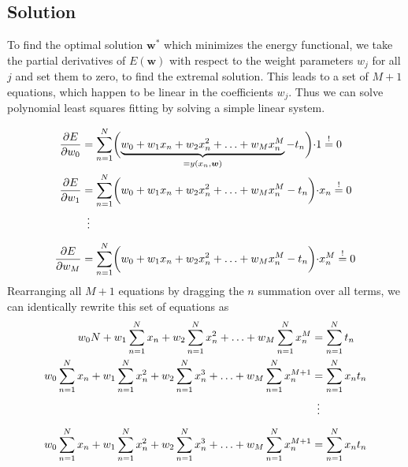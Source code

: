 \documentclass[11pt,DINA4, fleqn]{amsart}
\def\vw{\boldsymbol{w}\xspace}
\begin{document}
\subsection*{Solution}
To find the optimal solution $\vw^*$ which minimizes the energy functional, we take the partial derivatives of $E(\vw)$ with respect to the weight parameters $w_j$ for all $j$ and set them to zero, to find the extremal solution. This leads to a set of $M+1$ equations, which happen to be linear in the coefficients $w_j$. Thus we can solve polynomial least squares fitting by solving a simple linear system.

\begin{align}
\dfrac{\partial E}{\partial w_0} &= \sum \displaylimits_{n = 1}^{N}
\biggl(\underbrace{w_0 + w_1 x_n + w_2 x_n^2 + \dotsc + w_M x_n^M}_{=y(x_n,\vw)} - t_n\biggl) \cdot 1
\overset{!}{=} 0 \\
\dfrac{\partial E}{\partial w_1} &= \sum \displaylimits_{n = 1}^{N}
\biggl(w_0 + w_1 x_n + w_2 x_n^2 + \dotsc + w_M x_n^M - t_n\biggl) \cdot x_n
\overset{!}{=} 0 \\
\phantom{\dfrac{\partial E}{\partial w_M}}&\,\,\,\vdots \\
\dfrac{\partial E}{\partial w_M} &= \sum \displaylimits_{n = 1}^{N}
\biggl(w_0 + w_1 x_n + w_2 x_n^2 + \dotsc + w_M x_n^M - t_n\biggl) \cdot x_n^M
\overset{!}{=} 0
\end{align}
Rearranging all $M+1$ equations by dragging the $n$ summation over all terms, we can identically rewrite this set of equations as
\begin{align}
w_0 N + w_1 \sum\displaylimits_{n = 1}^{N}x_n
+ w_2 \sum\displaylimits_{n = 1}^{N}x_n^2 + \dotsc + w_M \sum\displaylimits_{n = 1}^{N}x_n^M  &= \sum\displaylimits_{n = 1}^{N} t_n \\
w_0 \sum\displaylimits_{n = 1}^{N} x_n + w_1 \sum\displaylimits_{n = 1}^{N}x_n^2
+ w_2 \sum\displaylimits_{n = 1}^{N}x_n^3 + \dotsc + w_M \sum\displaylimits_{n = 1}^{N}x_n^{M + 1}  &= \sum\displaylimits_{n = 1}^{N} x_n t_n
 \\
\phantom{\dfrac{\partial E}{\partial w_M}}&\,\,\,\vdots \\
w_0 \sum\displaylimits_{n = 1}^{N} x_n + w_1 \sum\displaylimits_{n = 1}^{N}x_n^2
+ w_2 \sum\displaylimits_{n = 1}^{N}x_n^3 + \dotsc + w_M \sum\displaylimits_{n = 1}^{N}x_n^{M + 1}  &= \sum\displaylimits_{n = 1}^{N} x_n t_n
\end{align}
\end{document}
